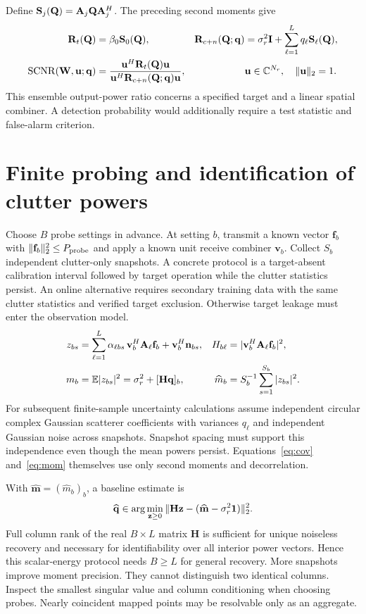 Define $\mathbf S_j(\mathbf Q)=\mathbf A_j\mathbf Q\mathbf A_j^H$. The preceding second moments give
\begin{align}
 \mathbf R_t(\mathbf Q)&=\beta_0\mathbf S_0(\mathbf Q),&
 \mathbf R_{c+n}(\mathbf Q;\mathbf q)&=\sigma_r^2\mathbf I+\sum_{\ell=1}^{L}q_\ell\mathbf S_\ell(\mathbf Q),\label{eq:cov}\\
 \operatorname{SCNR}(\mathbf W,\mathbf u;\mathbf q)&=\frac{\mathbf u^H\mathbf R_t(\mathbf Q)\mathbf u}{\mathbf u^H\mathbf R_{c+n}(\mathbf Q;\mathbf q)\mathbf u},&
 &\mathbf u\in\mathbb C^{N_r},\quad \|\mathbf u\|_2=1.\label{eq:scnr}
\end{align}
This ensemble output-power ratio concerns a specified target and a linear spatial combiner. A detection probability would additionally require a test statistic and false-alarm criterion.
\newpage
\section{Finite probing and identification of clutter powers}
Choose $B$ probe settings in advance. At setting $b$, transmit a known vector $\mathbf f_b$ with $\|\mathbf f_b\|_2^2\leq P_{\rm probe}$ and apply a known unit receive combiner $\mathbf v_b$. Collect $S_b$ independent clutter-only snapshots. A concrete protocol is a target-absent calibration interval followed by target operation while the clutter statistics persist. An online alternative requires secondary training data with the same clutter statistics and verified target exclusion. Otherwise target leakage must enter the observation model.
\begin{align}
 z_{bs}&=\sum_{\ell=1}^L\alpha_{\ell bs}\,\mathbf v_b^H\mathbf A_\ell\mathbf f_b+\mathbf v_b^H\mathbf n_{bs},
 &H_{b\ell}&=|\mathbf v_b^H\mathbf A_\ell\mathbf f_b|^2,\label{eq:probe}\\
 m_b&=\mathbb E|z_{bs}|^2=\sigma_r^2+[\mathbf H\mathbf q]_b,
 &\widehat m_b&=S_b^{-1}\sum_{s=1}^{S_b}|z_{bs}|^2.\label{eq:mom}
\end{align}
For subsequent finite-sample uncertainty calculations assume independent circular complex Gaussian scatterer coefficients with variances $q_\ell$ and independent Gaussian noise across snapshots. Snapshot spacing must support this independence even though the mean powers persist. Equations~\eqref{eq:cov} and~\eqref{eq:mom} themselves use only second moments and decorrelation.

With $\widehat{\mathbf m}=(\widehat m_b)_b$, a baseline estimate is
\begin{equation}
 \widehat{\mathbf q}\in\arg\min_{\mathbf z\geq0}
 \|\mathbf H\mathbf z-(\widehat{\mathbf m}-\sigma_r^2\mathbf 1)\|_2^2.\label{eq:nnls}
\end{equation}
Full column rank of the real $B\times L$ matrix $\mathbf H$ is sufficient for unique noiseless recovery and necessary for identifiability over all interior power vectors. Hence this scalar-energy protocol needs $B\geq L$ for general recovery. More snapshots improve moment precision. They cannot distinguish two identical columns. Inspect the smallest singular value and column conditioning when choosing probes. Nearly coincident mapped points may be resolvable only as an aggregate.

